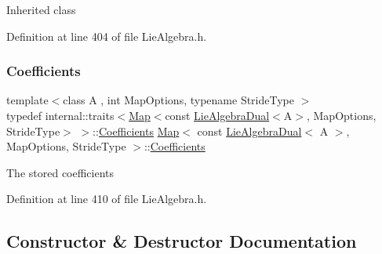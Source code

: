 Inherited class 

Definition at line 404 of file Lie\+Algebra.\+h.

\hypertarget{class_map_3_01const_01_lie_algebra_dual_3_01_a_01_4_00_01_map_options_00_01_stride_type_01_4_ae2a817b2902e4bf4f79a40724c8c9341}{}\label{class_map_3_01const_01_lie_algebra_dual_3_01_a_01_4_00_01_map_options_00_01_stride_type_01_4_ae2a817b2902e4bf4f79a40724c8c9341} 
\subsubsection{\texorpdfstring{Coefficients}{Coefficients}}
{\footnotesize\ttfamily template$<$class A , int Map\+Options, typename Stride\+Type $>$ \\
typedef internal\+::traits$<$\hyperlink{class_map_3_01const_01_lie_algebra_dual_3_01_a_01_4_00_01_map_options_00_01_stride_type_01_4_a3733e2160ea4f13268b2b3e34b33d7c7}{Map}$<$const \hyperlink{class_lie_algebra_dual}{Lie\+Algebra\+Dual}$<$A$>$, Map\+Options, Stride\+Type$>$ $>$\+::\hyperlink{class_map_3_01const_01_lie_algebra_dual_3_01_a_01_4_00_01_map_options_00_01_stride_type_01_4_ae2a817b2902e4bf4f79a40724c8c9341}{Coefficients} \hyperlink{class_map_3_01const_01_lie_algebra_dual_3_01_a_01_4_00_01_map_options_00_01_stride_type_01_4_a3733e2160ea4f13268b2b3e34b33d7c7}{Map}$<$ const \hyperlink{class_lie_algebra_dual}{Lie\+Algebra\+Dual}$<$ A $>$, Map\+Options, Stride\+Type $>$\+::\hyperlink{class_map_3_01const_01_lie_algebra_dual_3_01_a_01_4_00_01_map_options_00_01_stride_type_01_4_ae2a817b2902e4bf4f79a40724c8c9341}{Coefficients}}

The stored coefficients 

Definition at line 410 of file Lie\+Algebra.\+h.



\subsection{Constructor \& Destructor Documentation}
\hypertarget{class_map_3_01const_01_lie_algebra_dual_3_01_a_01_4_00_01_map_options_00_01_stride_type_01_4_a3733e2160ea4f13268b2b3e34b33d7c7}{}\label{class_map_3_01const_01_lie_algebra_dual_3_01_a_01_4_00_01_map_options_00_01_stride_type_01_4_a3733e2160ea4f13268b2b3e34b33d7c7} 

